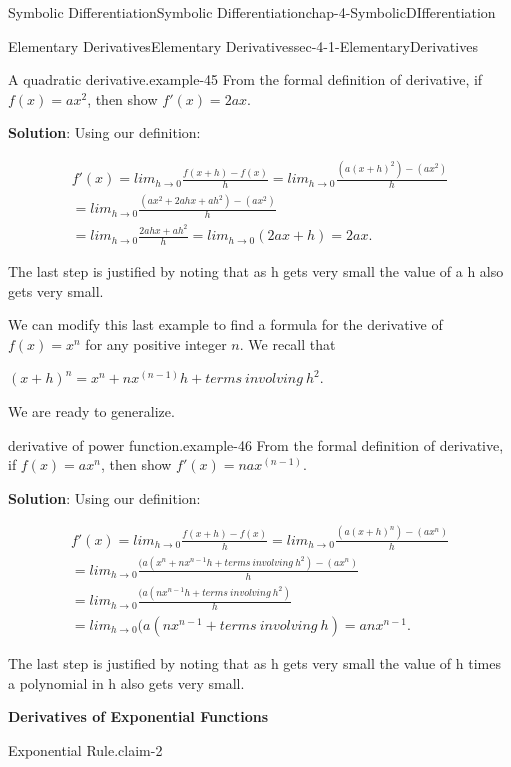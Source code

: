 \documentclass[oneside,10pt,]{book}
\newcommand{\terminology}[1]{\textbf{#1}}
\numberwithin{equation}{section}
\begin{document}
\begin{chapterptx}{Symbolic Differentiation}{}{Symbolic Differentiation}{}{}{chap-4-SymbolicDIfferentiation}
\begin{sectionptx}{Elementary Derivatives}{}{Elementary Derivatives}{}{}{sec-4-1-ElementaryDerivatives}
\begin{example}{A quadratic derivative.}{example-45}%
\hypertarget{p-1439}{}%
From the formal definition of derivative, if \(f(x)=a x^2\), then show \(f'(x)=2 a x\).%
\par
\hypertarget{p-1440}{}%
\terminology{Solution}: Using our definition:%
\par
\hypertarget{p-1441}{}%
%
\begin{gather*}
f'(x)=lim_{h\to0}\frac{f(x+h)-f(x)}{h}
=lim_{h\to0}\frac{(a (x+h)^2)-(a x^2)}{h}\\
=lim_{h\to0}\frac{(a x^2+2 a h x +a h^2)-(a x^2)}{h}\\
=lim_{h\to0}\frac{2 a h x +a h^2}{h}  =lim_{h\to0}(2ax+h)=2ax.
\end{gather*}
%
\par
\hypertarget{p-1442}{}%
The last step is justified by noting that as h gets very small the value of a h also gets very small.%
\end{example}
\hypertarget{p-1443}{}%
We can modify this last example to find a formula for the derivative of \(f(x)=x^n\) for any positive integer \(n\).  We recall that%
\par
\hypertarget{p-1444}{}%
\((x+h)^n=x^n+n x^{(n-1)}h+terms\ involving\ h^2.\)%
\par
\hypertarget{p-1445}{}%
We are ready to generalize.%
\begin{example}{derivative of power function.}{example-46}%
\hypertarget{p-1446}{}%
From the formal definition of derivative, if \(f(x)=a x^n\), then show \(f'(x)=n a x^{(n-1)}\).%
\par
\hypertarget{p-1447}{}%
\terminology{Solution}: Using our definition:%
\par
\hypertarget{p-1448}{}%
%
\begin{gather*}
f'(x)=lim_{h\to0}\frac{f(x+h)-f(x)}{h}
=lim_{h\to0}\frac{(a (x+h)^n)-(a x^n)}{h}\\
=lim_{h\to0}\frac{(a (x^n+n x^{n-1}h +terms\ involving \  h^2)-(a x^n)}{h}\\
=lim_{h\to0}\frac{(a (n x^{n-1}h +terms\ involving \  h^2)}{h}\\
=lim_{h\to0}(a (n x^{n-1} +terms\ involving \  h)=anx^{n-1}.
\end{gather*}
%
\par
\hypertarget{p-1449}{}%
The last step is justified by noting that as h gets very small the value of h times a polynomial in h also gets very small.%
\end{example}
\terminology{Derivatives of Exponential Functions}\begin{claim}{Exponential Rule.}{}{claim-2}%

\end{claim}
\end{sectionptx}
\end{chapterptx}
\end{document}
